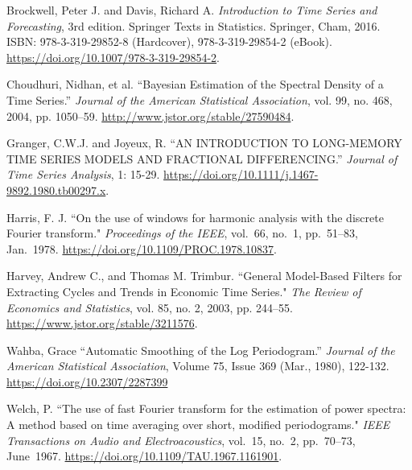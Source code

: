 \documentclass[preprint]{aastex}
\theoremstyle{nonitalicname}
\theoremstyle{plain}
\theoremstyle{remark}
\begin{document}
\begin{thebibliography}

Brockwell, Peter J. and Davis, Richard A. 
\newblock \textit{Introduction to Time Series and Forecasting}, 3rd edition. 
\newblock Springer Texts in Statistics. 
\newblock Springer, Cham, 2016. 
\newblock ISBN: 978-3-319-29852-8 (Hardcover), 978-3-319-29854-2 (eBook). 
\newblock \href{https://doi.org/10.1007/978-3-319-29854-2}{https://doi.org/10.1007/978-3-319-29854-2}.

Choudhuri, Nidhan, et al. 
\newblock ``Bayesian Estimation of the Spectral Density of a Time Series.''
\newblock \textit{Journal of the American Statistical Association}, vol. 99, no. 468, 2004, pp. 1050–59.
\newblock \href{http://www.jstor.org/stable/27590484}{http://www.jstor.org/stable/27590484}. 

Granger, C.W.J. and Joyeux, R. 
\newblock ``AN INTRODUCTION TO LONG-MEMORY TIME SERIES MODELS AND FRACTIONAL DIFFERENCING.''
\newblock \textit{Journal of Time Series Analysis}, 1: 15-29.
\newblock \href{https://doi.org/10.1111/j.1467-9892.1980.tb00297.x}{https://doi.org/10.1111/j.1467-9892.1980.tb00297.x}. 

Harris, F. J. 
\newblock ``On the use of windows for harmonic analysis with the discrete Fourier transform." 
\newblock \textit{Proceedings of the IEEE}, vol.~66, no.~1, pp.~51--83, Jan.~1978. 
\newblock \href{https://doi.org/10.1109/PROC.1978.10837}{https://doi.org/10.1109/PROC.1978.10837}. 

Harvey, Andrew C., and Thomas M. Trimbur.
\newblock ``General Model-Based Filters for Extracting Cycles and Trends in Economic Time Series." 
\newblock \textit{The Review of Economics and Statistics}, vol. 85, no. 2, 2003, pp. 244–55.
\newblock \href{https://www.jstor.org/stable/3211576}{https://www.jstor.org/stable/3211576}. 



Wahba, Grace
\newblock ``Automatic Smoothing of the Log Periodogram.''
\newblock \textit{Journal of the American Statistical Association}, Volume 75, Issue 369 (Mar., 1980),
122-132.
\newblock \href{https://doi.org/10.2307/2287399}{https://doi.org/10.2307/2287399}

Welch, P.
\newblock ``The use of fast Fourier transform for the estimation of power spectra: A method based on time averaging over short, modified periodograms."
\newblock \textit{IEEE Transactions on Audio and Electroacoustics}, vol.~15, no.~2, pp.~70--73, June~1967.
\newblock \href{https://doi.org/10.1109/TAU.1967.1161901}{https://doi.org/10.1109/TAU.1967.1161901}.


\end{thebibliography}
\end{document}
